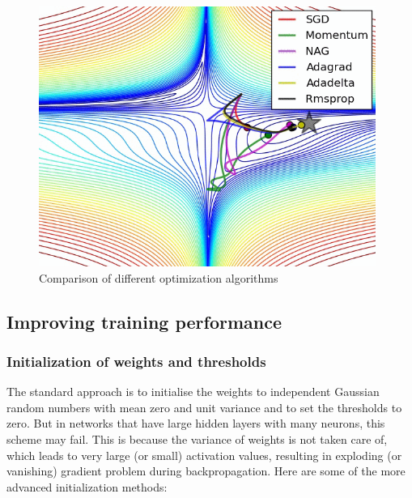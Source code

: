 	\vspace{4mm}
\begin{figure}[htb]
	\begin{center}
		\includegraphics*[width=11cm, keepaspectratio]{obr/opt.png}
	\end{center}
	\vspace{4mm}
	\caption{Comparison of different optimization algorithms \cite{groman}} 
	\label{algorithms}
\end{figure}

\newpage
\subsection{Improving training performance}
\subsubsection{Initialization of weights and thresholds}

The standard approach is to initialise the weights to independent Gaussian random numbers with mean zero and unit variance and to set the thresholds to zero. But in networks that have large hidden layers with many neurons, this scheme may fail. \cite{mehlig} This is because the variance of weights is not taken care of, which leads to very large (or small) activation values, resulting in exploding (or vanishing) gradient problem during backpropagation. Here are some of the more advanced initialization methods:

